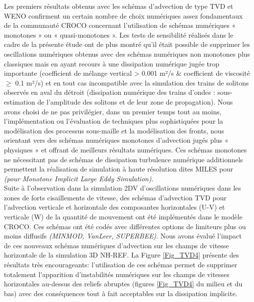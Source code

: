 \noindent Les premiers résultats obtenus avec les schémas d’advection de type TVD et WENO confirment un certain nombre de choix numériques assez fondamentaux de la communauté CROCO concernant l’utilisation de schémas numériques « monotones » ou « quasi-monotones ». Les tests de sensibilité réalisés dans le cadre de la présente étude ont de plus montré qu’il était possible de supprimer les oscillations numériques obtenus avec des schémas numériques non monotones plus classiques mais en ayant recours à une dissipation numérique jugée trop importante (coefficient de mélange vertical > 0.001 m²/s $\&$  coefficient de viscosité $ \geq $ 0.1 m²/s) et en tout cas incompatible avec la simulation des trains de solitons observés en aval du détroit (dissipation numérique des trains d’ondes : sous-estimation de l’amplitude des solitons et de leur zone de propagation). Nous avons choisi de ne pas privilégier, dans un premier temps tout au moins, l’implémentation ou l’évaluation de techniques plus sophistiquées pour la modélisation des processus sous-maille et la modélisation des fronts, nous orientant vers des schémas numériques monotones d’advection jugés plus « physiques » et offrant de meilleurs résultats numériques. Ces schémas monotones ne nécessitant pas de schémas de dissipation turbulence numérique additionnels permettent la réalisation de simulation à haute résolution dites MILES pour \textit{(pour Monotone Implicit Large Eddy Simulation)}.\\

\noindent Suite à l’observation dans la simulation 2DV d’oscillations numériques dans les zones de forts cisaillements de vitesse, des schémas d’advection TVD pour l’advection verticale et horizontale des composantes horizontales (U-V) et verticale (W) de la quantité de mouvement ont été implémentés dans le modèle CROCO. Ces schémas ont été codés avec différentes options de limiteurs plus ou moins diffusifs \textit{(MINMOD, VanLeer, SUPERBEE)}. Nous avons évalué l’impact de ces nouveaux schémas numériques d’advection sur les champs de vitesse horizontale de la simulation 3D NH-REF. La Figure \ref{Fig_TVD4} présente des résultats très encourageants: l’utilisation de ces schémas permet de supprimer totalement l’apparition d’instabilités numériques sur les champs de vitesses horizontales au-dessus des reliefs abruptes (figures \ref{Fig_TVD4} du milieu et du bas) avec des conséquences tout à fait acceptables sur la dissipation implicite.


